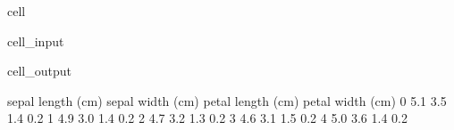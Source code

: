 \documentclass[letterpaper,10pt,english]{jupyterBook}
\begin{document}
\begin{sphinxuseclass}{cell}\begin{sphinxVerbatimInput}

\begin{sphinxuseclass}{cell_input}
\begin{sphinxVerbatim}[commandchars=\\\{\}]
   
  
  
\end{sphinxVerbatim}

\end{sphinxuseclass}\end{sphinxVerbatimInput}
\begin{sphinxVerbatimOutput}

\begin{sphinxuseclass}{cell_output}
\begin{sphinxVerbatim}[commandchars=\\\{\}]
   sepal length (cm)  sepal width (cm)  petal length (cm)  petal width (cm)
0                5.1               3.5                1.4               0.2
1                4.9               3.0                1.4               0.2
2                4.7               3.2                1.3               0.2
3                4.6               3.1                1.5               0.2
4                5.0               3.6                1.4               0.2
\end{sphinxVerbatim}

\end{sphinxuseclass}\end{sphinxVerbatimOutput}

\end{sphinxuseclass}
\end{document}
